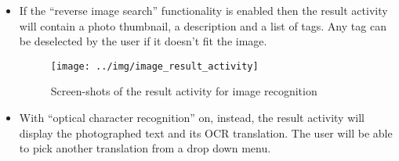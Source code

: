 \begin{itemize}
\begin{itemize}
     \item If the ``reverse image search'' functionality is enabled then the
result activity will contain a photo thumbnail, a description and a list of
tags. Any tag can be deselected by the user if it doesn't fit the image.
    \begin{figure}[h]
        \centering
        \texttt{[image: ../img/image\_result\_activity]}
        \caption{Screen-shots of the result activity for image recognition}
        \label{fig:splash}
    \end{figure}
     \item With ``optical character recognition'' on, instead, the result
activity will display the photographed text and its OCR translation. The user
will be able to pick another translation from a drop down menu.
    \end{itemize}
\end{itemize}